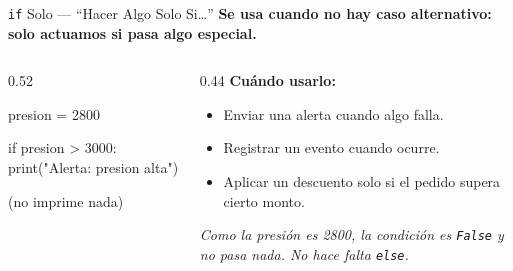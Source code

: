 \documentclass[aspectratio=169, 11pt]{beamer}
\begin{document}
\begin{frame}[fragile,shrink=8]{\texttt{if} Solo --- ``Hacer Algo Solo Si\ldots''}
  \vspace{-4pt}
  {\small\color{arcaDark}\bfseries
    Se usa cuando \textbf{no hay caso alternativo}: solo actuamos si pasa algo especial.}

  \vspace{6pt}
  \begin{columns}[T]
    \begin{column}{0.52\textwidth}
      \begin{pyblock}
presion = 2800

if presion > 3000:
    print("Alerta: presion alta")
      \end{pyblock}
      \vspace{2pt}
      \begin{outputblock}
(no imprime nada)
      \end{outputblock}
    \end{column}

    \begin{column}{0.44\textwidth}
      {\scriptsize\color{arcaDark}\bfseries Cuándo usarlo:}
      \vspace{2pt}
      {\scriptsize\color{textMuted}
      \begin{itemize}\setlength{\itemsep}{4pt}
        \item[{\color{codeGreen}\scriptsize\faCheck}]
          Enviar una alerta cuando algo falla.
        \item[{\color{codeGreen}\scriptsize\faCheck}]
          Registrar un evento cuando ocurre.
        \item[{\color{codeGreen}\scriptsize\faCheck}]
          Aplicar un descuento solo si el pedido
          supera cierto monto.
      \end{itemize}
      }
      \vspace{3pt}
      {\scriptsize\color{textMuted}\itshape
        Como la presión es 2800, la condición es
        \texttt{False} y no pasa nada. No hace
        falta \texttt{else}.}
    \end{column}
  \end{columns}
\end{frame}
\end{document}
